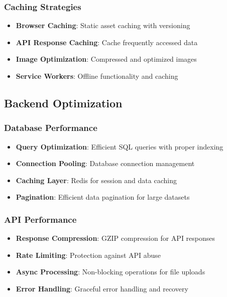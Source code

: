 \documentclass[11pt,a4paper]{article}
\begin{document}
\subsubsection{Caching Strategies}
\begin{itemize}
    \item \textbf{Browser Caching}: Static asset caching with versioning
    \item \textbf{API Response Caching}: Cache frequently accessed data
    \item \textbf{Image Optimization}: Compressed and optimized images
    \item \textbf{Service Workers}: Offline functionality and caching
\end{itemize}

\subsection{Backend Optimization}

\subsubsection{Database Performance}
\begin{itemize}
    \item \textbf{Query Optimization}: Efficient SQL queries with proper indexing
    \item \textbf{Connection Pooling}: Database connection management
    \item \textbf{Caching Layer}: Redis for session and data caching
    \item \textbf{Pagination}: Efficient data pagination for large datasets
\end{itemize}

\subsubsection{API Performance}
\begin{itemize}
    \item \textbf{Response Compression}: GZIP compression for API responses
    \item \textbf{Rate Limiting}: Protection against API abuse
    \item \textbf{Async Processing}: Non-blocking operations for file uploads
    \item \textbf{Error Handling}: Graceful error handling and recovery
\end{itemize}
\end{document}
